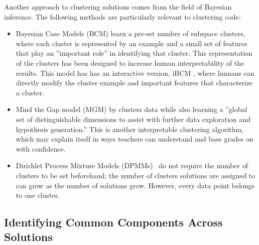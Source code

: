Another approach to clustering solutions comes from the field of Bayesian inference. The following methods are particularly relevant to clustering code:
\begin{itemize}
\item Bayesian Case Models (BCM) \citet{beenNIPS} learn a pre-set number of subspace clusters, where each cluster is represented by an example and a small set of features that play an ''important role'' in identifying that cluster. This representation of the clusters has been designed to increase human interpretability of the results. This model has has an interactive version, iBCM \cite{beenthesis}, where humans can directly modify the cluster example and important features that characterize a cluster.
\item Mind the Gap model (MGM) by \citet{kim2015mind} clusters data while also learning a ''global set of distinguishable dimensions to assist with further data exploration and hypothesis generation.'' This is another interpretable clustering algorithm, which may explain itself in ways teachers can understand and base grades on with confidence.
\item Dirichlet Process Mixture Models (DPMMs)~\cite{} do not require the number of clusters to be set beforehand; the number of clusters solutions are assigned to can grow as the number of solutions grow. However, every data point belongs to one cluster.
\end{itemize}







\subsection{Identifying Common Components Across Solutions}

